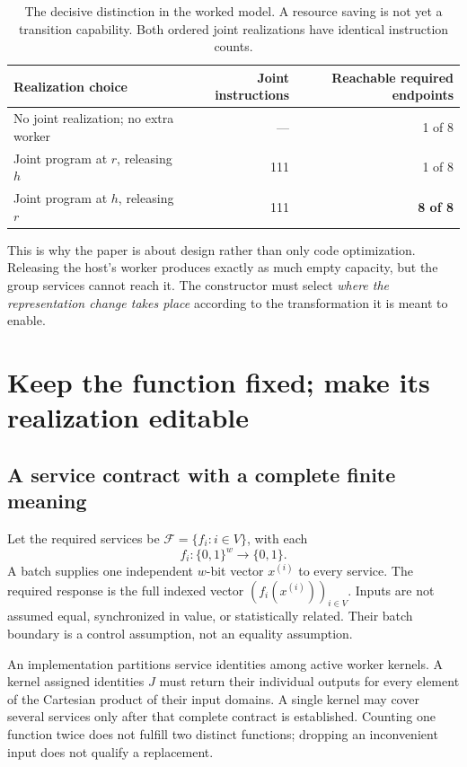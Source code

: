 \documentclass[11pt,letterpaper]{article}
\theoremstyle{definition}\newtheorem{definition}[theorem]{Definition}
\theoremstyle{remark}\newtheorem{remark}[theorem]{Remark}
\newcommand{\F}{\mathcal F}
\begin{document}
\begin{table}[htbp]\centering\small
\caption{The decisive distinction in the worked model. A resource saving is not yet a transition capability. Both ordered joint realizations have identical instruction counts.}
\begin{tabularx}{\linewidth}{@{}Yrr@{}}\toprule
Realization choice & Joint instructions & Reachable required endpoints\\\midrule
No joint realization; no extra worker & --- & 1 of 8\\
Joint program at $r$, releasing $h$ & 111 & 1 of 8\\
Joint program at $h$, releasing $r$ & 111 & \textbf{8 of 8}\\\bottomrule
\end{tabularx}
\label{tab:direction}
\end{table}

This is why the paper is about design rather than only code optimization. Releasing the host's worker produces exactly as much empty capacity, but the group services cannot reach it. The constructor must select \emph{where the representation change takes place} according to the transformation it is meant to enable.

\section{Keep the function fixed; make its realization editable}
\label{sec:model}
\subsection{A service contract with a complete finite meaning}
Let the required services be $\F=\{f_i:i\in V\}$, with each
\begin{equation}
 f_i:\{0,1\}^{w}\longrightarrow\{0,1\}.
 \label{eq:services}
\end{equation}
A batch supplies one independent $w$-bit vector $x^{(i)}$ to every service. The required response is the full indexed vector $(f_i(x^{(i)}))_{i\in V}$. Inputs are not assumed equal, synchronized in value, or statistically related. Their batch boundary is a control assumption, not an equality assumption.

An implementation partitions service identities among active worker kernels. A kernel assigned identities $J$ must return their individual outputs for every element of the Cartesian product of their input domains. A single kernel may cover several services only after that complete contract is established. Counting one function twice does not fulfill two distinct functions; dropping an inconvenient input does not qualify a replacement.
\end{document}

